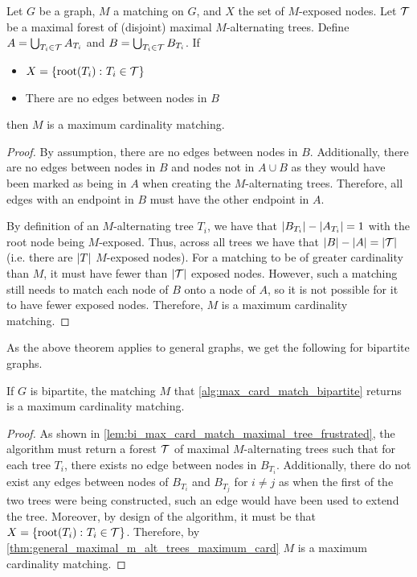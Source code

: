 \begin{theorem}
    Let $G$ be a graph, $M$ a matching on $G$, and $X$ the set of $M$-exposed nodes. Let $\calT$ be a maximal forest of (disjoint) maximal $M$-alternating trees.  
    Define $A = \bigcup_{T_i \in \calT} A_{T_i}$ and $B = \bigcup_{T_i \in \calT} B_{T_i}$. If 
    \begin{itemize}[label=--]
        \item $X = \lrc{\f[\mathrm{root}]{T_i} \colon T_i \in \calT}$
        \item There are no edges between nodes in $B$ 
    \end{itemize}
    then $M$ is a maximum cardinality matching. 
    \label{thm:general_maximal_m_alt_trees_maximum_card}
\end{theorem}
\begin{proof}
    By assumption, there are no edges between nodes in $B$. 
    Additionally, there are no edges between nodes in $B$ and nodes not in $A \cup B$ as they would have been marked as being in $A$ when creating the $M$-alternating trees. 
    Therefore, all edges with an endpoint in $B$ must have the other endpoint in $A$. 

    By definition of an $M$-alternating tree $T_i$, we have that $\abs{B_{T_i}} - \abs{A_{T_i}} = 1$ with the root node being $M$-exposed. Thus, across all trees we have that 
    $\abs{B} - \abs{A} = \abs{\calT}$ (i.e.\! there are $\abs{T}$ $M$-exposed nodes). 
    For a matching to be of greater cardinality than $M$, it must have fewer than $\abs{\calT}$ exposed nodes. 
    However, such a matching still needs to match each node of $B$ onto a node of $A$, so it is not possible for it to have fewer exposed nodes. 
    Therefore, $M$ is a maximum cardinality matching. 
\end{proof}

As the above theorem applies to general graphs, we get the following for bipartite graphs.  

\begin{theorem}
    If $G$ is bipartite, the matching $M$ that \cref{alg:max_card_match_bipartite} returns is a maximum cardinality matching. 
    \label{thm:bipartite_max_card_matching}
\end{theorem}
\begin{proof}
    As shown in \cref{lem:bi_max_card_match_maximal_tree_frustrated}, the algorithm must 
    return a forest $\calT$ of maximal $M$-alternating trees such that for each tree $T_i$, there exists no edge between nodes in $B_{T_i}$. 
    Additionally, there do not exist any edges between nodes of $B_{T_i}$ and $B_{T_j}$ for $i \neq j$ as when the first of the two trees 
    were being constructed, such an edge would have been used to extend the tree. 
    Moreover, by design of the algorithm, it must be that $X = \lrc{\f[\mathrm{root}]{T_i} \colon T_i \in \calT}$. 
    Therefore, by \cref{thm:general_maximal_m_alt_trees_maximum_card} $M$ is a maximum cardinality matching. 
\end{proof}

